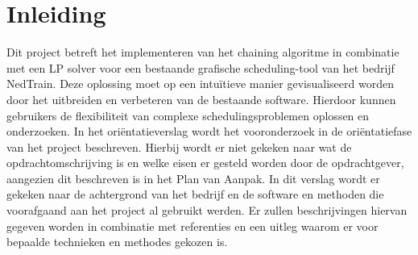 \section{Inleiding}
Dit project betreft het implementeren van het chaining algoritme in combinatie met een LP solver voor een bestaande grafische scheduling-tool van het bedrijf NedTrain. Deze oplossing moet op een intu\"itieve manier gevisualiseerd worden door het uitbreiden en verbeteren van de bestaande software. Hierdoor kunnen gebruikers de flexibiliteit van complexe schedulingsproblemen oplossen en onderzoeken. In het ori\"entatieverslag wordt het vooronderzoek in de ori\"entatiefase van het project beschreven. Hierbij wordt er niet gekeken naar wat de opdrachtomschrijving is en welke eisen er gesteld worden door de opdrachtgever, aangezien dit beschreven is in het Plan van Aanpak. In dit verslag wordt er gekeken naar de achtergrond van het bedrijf en de software en methoden die voorafgaand aan het project al gebruikt werden. Er zullen beschrijvingen hiervan gegeven worden in combinatie met referenties en een uitleg waarom er voor bepaalde technieken en methodes gekozen is.
